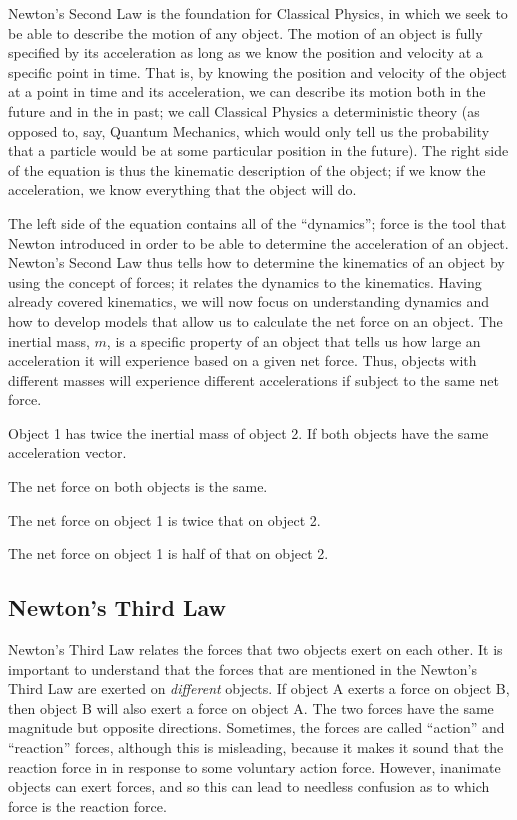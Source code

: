Newton's Second Law is the foundation for Classical Physics, in which we seek to be able to describe the motion of any object. The motion of an object is fully specified by its acceleration as long as we know the position and velocity at a specific point in time. That is, by knowing the position and velocity of the object at a point in time and its acceleration, we can describe its motion both in the future and in the in past; we call Classical Physics a deterministic theory (as opposed to, say, Quantum Mechanics, which would only tell us the probability that a particle would be at some particular position in the future). The right side of the equation is thus the kinematic description of the object; if we know the acceleration, we know everything that the object will do.

The left side of the equation contains all of the ``dynamics''; force is the tool that Newton introduced in order to be able to determine the acceleration of an object. Newton's Second Law thus tells how to determine the kinematics of an object by using the concept of forces; it relates the dynamics to the kinematics. Having already covered kinematics, we will now focus on understanding dynamics and how to develop models that allow us to calculate the net force on an object. The inertial mass, $m$, is a specific property of an object that tells us how large an acceleration it will experience based on a given net force. Thus, objects with different masses will experience different accelerations if subject to the same net force.

\begin{checkpoint}
\begin{MCquestion}{Object 1 has twice the inertial mass of object 2. If both objects have the same acceleration vector.}
\item The net force on both objects is the same.
\item The net force on object 1 is twice that on object 2. %
\item The net force on object 1 is half of that on object 2.
\end{MCquestion}
\end{checkpoint}


\subsection{Newton's Third Law}
Newton's Third Law relates the forces that two objects exert on each other. It is important to understand that the forces that are mentioned in the Newton's Third Law are exerted on \textit{different} objects. If object A exerts a force on object B, then object B will also exert a force on object A. The two forces have the same magnitude but opposite directions. Sometimes, the forces are called ``action'' and ``reaction'' forces, although this is misleading, because it makes it sound that the reaction force in in response to some voluntary action force. However, inanimate objects can exert forces, and so this can lead to needless confusion as to which force is the reaction force.

